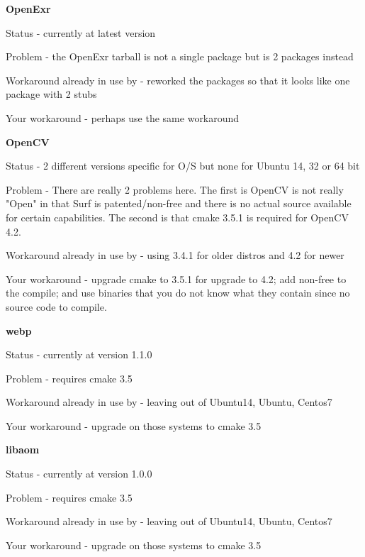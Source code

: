 \textbf{OpenExr} 
\begin{description}[noitemsep]
     \item Status - currently at latest version 
     \item Problem - the OpenExr tarball is not a single package but is 2 packages instead
     \item Workaround already in use by \CGG{} - reworked the packages so that it looks like
one package with 2 stubs
     \item Your workaround - perhaps use the same workaround
\end{description}

\textbf{OpenCV}
\begin{description}[noitemsep]
     \item Status - 2 different versions specific for O/S but none for Ubuntu 14, 32 or 64 bit
     \item Problem - There are really 2 problems here.  The first is OpenCV is not really
"Open" in that Surf is patented/non-free and there is no actual source available for certain
capabilities. The second is that cmake 3.5.1 is required for OpenCV 4.2.
     \item Workaround already in use by \CGG{} - using 3.4.1 for older distros and 4.2 for newer
     \item Your workaround - upgrade cmake to 3.5.1 for upgrade to 4.2; add non-free to the
compile; and use binaries that you do not know what they contain since no source code to compile.
\end{description}

\textbf{webp}
\begin{description}[noitemsep]
     \item Status - currently at version 1.1.0
     \item Problem - requires cmake 3.5 
     \item Workaround already in use by \CGG{} - leaving out of Ubuntu14, Ubuntu, Centos7
     \item Your workaround - upgrade on those systems to cmake 3.5
\end{description}

\textbf{libaom}
\begin{description}[noitemsep]
     \item Status - currently at version 1.0.0 
     \item Problem - requires cmake 3.5 
     \item Workaround already in use by \CGG{} - leaving out of Ubuntu14, Ubuntu, Centos7
     \item Your workaround - upgrade on those systems to cmake 3.5
\end{description}

